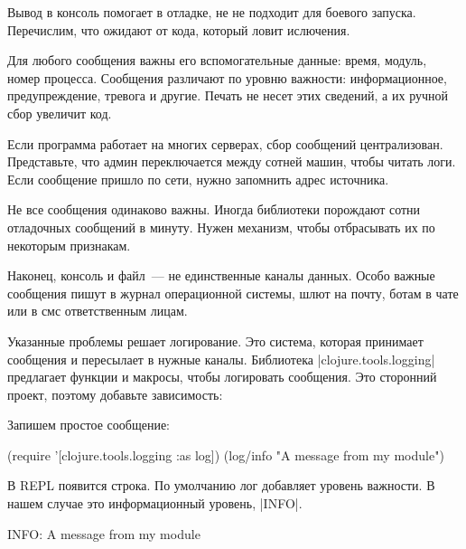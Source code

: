 Вывод в консоль помогает в отладке, не не подходит для боевого
запуска. Перечислим, что ожидают от кода, который ловит ислючения.

Для любого сообщения важны его вспомогательные данные: время, модуль, номер
процесса. Сообщения различают по уровню важности: информационное,
предупреждение, тревога и другие. Печать не несет этих сведений, а их ручной
сбор увеличит код.

Если программа работает на многих серверах, сбор сообщений
централизован. Представьте, что админ переключается между сотней машин, чтобы
читать логи. Если сообщение пришло по сети, нужно запомнить адрес источника.

Не все сообщения одинаково важны. Иногда библиотеки порождают сотни отладочных
сообщений в минуту. Нужен механизм, чтобы отбрасывать их по некоторым признакам.

Наконец, консоль и файл~--- не единственные каналы данных. Особо важные
сообщения пишут в журнал операционной системы, шлют на почту, ботам в чате или в
смс ответственным лицам.

Указанные проблемы решает логирование. Это система, которая принимает сообщения
и пересылает в нужные каналы. Библиотека \spverb|clojure.tools.logging|
предлагает функции и макросы, чтобы логировать сообщения. Это сторонний проект,
поэтому добавьте зависимость:

\begin{english}
  \begin{clojure}
  \end{clojure}
\end{english}

\noindent
Запишем простое сообщение:

\begin{english}
  \begin{clojure}
(require '[clojure.tools.logging :as log])
(log/info "A message from my module")
  \end{clojure}
\end{english}

\noindent
В REPL появится строка. По умолчанию лог добавляет уровень важности. В нашем
случае это информационный уровень, \spverb|INFO|.

\begin{english}
  \begin{text}
INFO: A message from my module
  \end{text}
\end{english}

